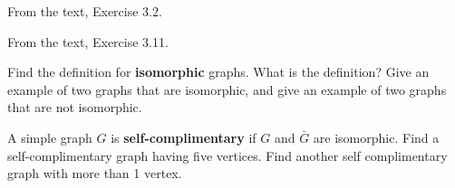 \begin{exercise}
From the text, Exercise 3.2.
\end{exercise}


\begin{exercise}
From the text, Exercise 3.11.
\end{exercise}





\begin{exercise} 
Find the definition for {\bf isomorphic} graphs.  What is the definition?  Give an example of two graphs that are isomorphic, and give an example of two graphs that are not isomorphic.
\end{exercise}


\begin{exercise} 
A simple graph $G$ is {\bf self-complimentary} if $G$ and $\bar{G}$ are isomorphic.  Find a self-complimentary graph having five vertices.  Find another self complimentary graph with more than 1 vertex.
\end{exercise}



